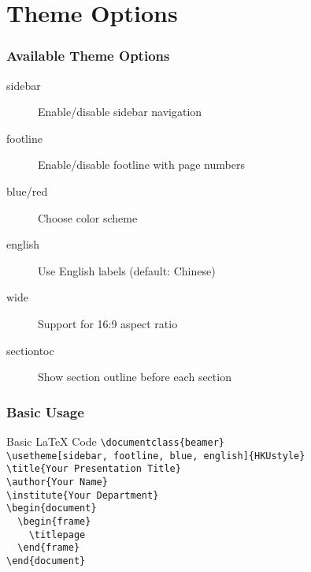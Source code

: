 \section{Theme Options}

\begin{frame}
	\frametitle{Available Theme Options}
	\begin{description}
		\item[sidebar] Enable/disable sidebar navigation
		\item[footline] Enable/disable footline with page numbers
		\item[blue/red] Choose color scheme
		\item[english] Use English labels (default: Chinese)
		\item[wide] Support for 16:9 aspect ratio
		\item[sectiontoc] Show section outline before each section
	\end{description}
\end{frame}

\begin{frame}
	\frametitle{Basic Usage}
	\small
	\begin{block}{Basic LaTeX Code}
		\texttt{\textbackslash documentclass\{beamer\}} \\
		\texttt{\textbackslash usetheme[sidebar, footline, blue, english]\{HKUstyle\}} \\[0.5em]
		\texttt{\textbackslash title\{Your Presentation Title\}} \\
		\texttt{\textbackslash author\{Your Name\}} \\
		\texttt{\textbackslash institute\{Your Department\}} \\[0.5em]
		\texttt{\textbackslash begin\{document\}} \\
		\texttt{\ \ \textbackslash begin\{frame\}} \\
		\texttt{\ \ \ \ \textbackslash titlepage} \\
		\texttt{\ \ \textbackslash end\{frame\}} \\
		\texttt{\textbackslash end\{document\}}
	\end{block}
\end{frame} 